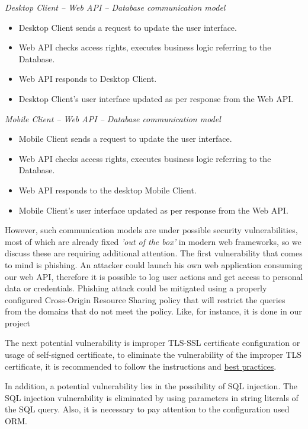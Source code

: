 \textit{Desktop Client -- Web API -- Database communication model}
\begin{itemize}
    \item Desktop Client sends a request to update the user interface.
    \item Web API checks access rights, executes business logic referring to the Database.
    \item Web API responds to Desktop Client.
    \item Desktop Client's user interface updated as per response from the Web API\@.
\end{itemize}

\textit{Mobile Client -- Web API -- Database communication model}
\begin{itemize}
    \item Mobile Client sends a request to update the user interface.
    \item Web API checks access rights, executes business logic referring to the Database.
    \item Web API responds to the desktop Mobile Client.
    \item Mobile Client's user interface updated as per response from the Web API\@.
\end{itemize}

However, such communication models are under possible security vulnerabilities, most of which are already fixed
\textit{'out of the box'} in modern web frameworks, so we discuss these are requiring additional attention.
The first vulnerability that comes to mind is phishing.
An attacker could launch his own web application consuming our web API, therefore it is possible to log user actions
and get access to personal data or credentials.
Phishing attack could be mitigated using a properly configured Cross-Origin Resource Sharing policy that will restrict
the queries from the domains that do not meet the policy.
Like, for instance, it is done in our project



The next potential vulnerability is improper TLS-SSL certificate configuration or usage of self-signed certificate,
to eliminate the vulnerability of the improper TLS certificate, it is recommended to follow the instructions and
\href{https://www.ssl.com/guide/ssl-best-practices/}{best practices}.

In addition, a potential vulnerability lies in the possibility of SQL injection.
The SQL injection vulnerability is eliminated by using parameters in string literals of the SQL query.
Also, it is necessary to pay attention to the configuration used ORM\@.


